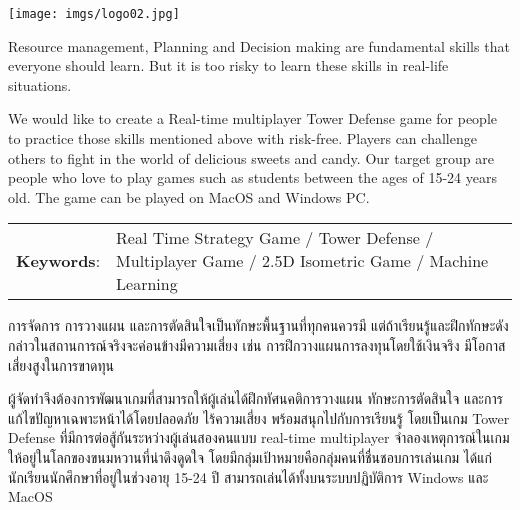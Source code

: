 \documentclass[12pt,oneside,openright,a4paper]{cpe-thai-project}
\begin{document}
\pdfstringdefDisableCommands{%
\let\MakeUppercase\relax
}

\begin{center}
  \texttt{[image: imgs/logo02.jpg]}
\end{center}
\vspace*{-1cm}

\maketitlepage
\makesignaturepage 


\abstract

Resource management, Planning and Decision making are fundamental skills 
that everyone should learn. But it is too risky to learn these skills in real-life situations.

We would like to create a Real-time multiplayer Tower Defense game for people to practice 
those skills mentioned above with risk-free. Players can challenge others to fight in the 
world of delicious sweets and candy. Our target group are people who love to play games such as 
students between the ages of 15-24 years old. The game can be played on MacOS and Windows PC.

\begin{flushleft}
\begin{tabular*}{\textwidth}{@{}lp{}}
\textbf{Keywords}: & Real Time Strategy Game / Tower Defense / Multiplayer Game / 2.5D Isometric Game / Machine Learning
\end{tabular*}
\end{flushleft}
\endabstract


\thaiabstract

การจัดการ การวางแผน และการตัดสินใจเป็นทักษะพื้นฐานที่ทุกคนควรมี 
แต่ถ้าเรียนรู้และฝึกทักษะดังกล่าวในสถานการณ์จริงจะค่อนข้างมีความเสี่ยง เช่น การฝึกวางแผนการลงทุนโดยใช้เงินจริง 
มีโอกาสเสี่ยงสูงในการขาดทุน 

ผู้จัดทำจึงต้องการพัฒนาเกมที่สามารถให้ผู้เล่นได้ฝึกทัศนคติการวางแผน 
ทักษะการตัดสินใจ และการแก้ไขปัญหาเฉพาะหน้าได้โดยปลอดภัย ไร้ความเสี่ยง 
พร้อมสนุกไปกับการเรียนรู้ โดยเป็นเกม Tower Defense ที่มีการต่อสู้กันระหว่างผู้เล่นสองคนแบบ 
real-time multiplayer จำลองเหตุการณ์ในเกมให้อยู่ในโลกของขนมหวานที่น่าดึงดูดใจ 
โดยมีกลุ่มเป้าหมายคือกลุ่มคนที่ชื่นชอบการเล่นเกม ได้แก่ นักเรียนนักศึกษาที่อยู่ในช่วงอายุ 15-24 ปี
สามารถเล่นได้ทั้งบนระบบปฏิบัติการ Windows และ MacOS
\end{document}
